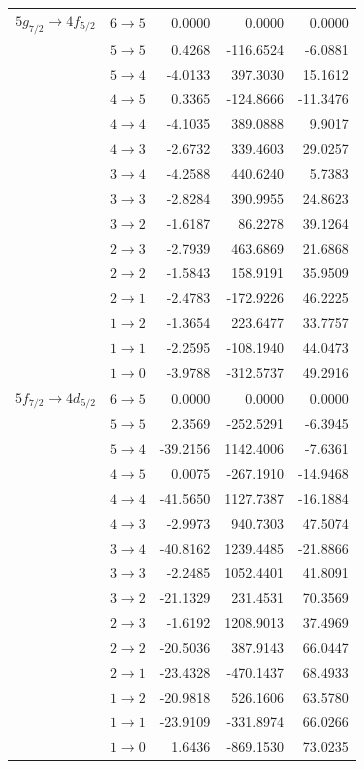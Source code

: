\begin{table}[b]
\begin{tiny}
\begin{tabular}{cc|rrr}
$5g_{7/2} \rightarrow 4f_{5/2}$ & $6 \rightarrow 5$ & 0.0000 & 0.0000 & 0.0000 \\
& $5 \rightarrow 5$ & 0.4268 & -116.6524 & -6.0881 \\
& $5 \rightarrow 4$ & -4.0133 & 397.3030 & 15.1612 \\
& $4 \rightarrow 5$ & 0.3365 & -124.8666 & -11.3476 \\
& $4 \rightarrow 4$ & -4.1035 & 389.0888 & 9.9017 \\
& $4 \rightarrow 3$ & -2.6732 & 339.4603 & 29.0257 \\
& $3 \rightarrow 4$ & -4.2588 & 440.6240 & 5.7383 \\
& $3 \rightarrow 3$ & -2.8284 & 390.9955 & 24.8623 \\
& $3 \rightarrow 2$ & -1.6187 & 86.2278 & 39.1264 \\
& $2 \rightarrow 3$ & -2.7939 & 463.6869 & 21.6868 \\
& $2 \rightarrow 2$ & -1.5843 & 158.9191 & 35.9509 \\
& $2 \rightarrow 1$ & -2.4783 & -172.9226 & 46.2225 \\
& $1 \rightarrow 2$ & -1.3654 & 223.6477 & 33.7757 \\
& $1 \rightarrow 1$ & -2.2595 & -108.1940 & 44.0473 \\
& $1 \rightarrow 0$ & -3.9788 & -312.5737 & 49.2916 \\[7pt]

$5f_{7/2} \rightarrow 4d_{5/2}$ & $6 \rightarrow 5$ & 0.0000 & 0.0000 & 0.0000 \\
& $5 \rightarrow 5$ & 2.3569 & -252.5291 & -6.3945 \\
& $5 \rightarrow 4$ & -39.2156 & 1142.4006 & -7.6361 \\
& $4 \rightarrow 5$ & 0.0075 & -267.1910 & -14.9468 \\
& $4 \rightarrow 4$ & -41.5650 & 1127.7387 & -16.1884 \\
& $4 \rightarrow 3$ & -2.9973 & 940.7303 & 47.5074 \\
& $3 \rightarrow 4$ & -40.8162 & 1239.4485 & -21.8866 \\
& $3 \rightarrow 3$ & -2.2485 & 1052.4401 & 41.8091 \\
& $3 \rightarrow 2$ & -21.1329 & 231.4531 & 70.3569 \\
& $2 \rightarrow 3$ & -1.6192 & 1208.9013 & 37.4969 \\
& $2 \rightarrow 2$ & -20.5036 & 387.9143 & 66.0447 \\
& $2 \rightarrow 1$ & -23.4328 & -470.1437 & 68.4933 \\
& $1 \rightarrow 2$ & -20.9818 & 526.1606 & 63.5780 \\
& $1 \rightarrow 1$ & -23.9109 & -331.8974 & 66.0266 \\
& $1 \rightarrow 0$ & 1.6436 & -869.1530 & 73.0235 \\[7pt]


\end{tabular}
\end{tiny}
\end{table}
